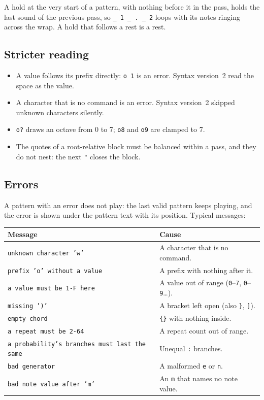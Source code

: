 \documentclass[11pt,a4paper]{article}
\newcommand{\pat}[1]{\texttt{#1}}
\begin{document}
A hold at the very start of a pattern, with nothing before it in the pass, holds
the last sound of the previous pass, so \pat{\_ 1 \_ . \_ 2} loops with its
notes ringing across the wrap. A hold that follows a rest is a rest.

\subsection{Stricter reading}

\begin{itemize}[leftmargin=1.5em]
  \item A value follows its prefix directly: \pat{o 1} is an error. Syntax
        version~2 read the space as the value.
  \item A character that is no command is an error. Syntax version~2 skipped
        unknown characters silently.
  \item \pat{o?} draws an octave from 0 to 7; \pat{o8} and \pat{o9} are clamped
        to 7.
  \item The quotes of a root-relative block must be balanced within a pass, and
        they do not nest: the next \pat{"} closes the block.
\end{itemize}

\subsection{Errors}

A pattern with an error does not play: the last valid pattern keeps playing, and
the error is shown under the pattern text with its position. Typical messages:

\begin{center}
\begin{tabular}{@{}ll@{}}
\toprule
\textbf{Message} & \textbf{Cause}\\
\midrule
\pat{unknown character 'w'}                  & A character that is no command.\\
\pat{prefix 'o' without a value}             & A prefix with nothing after it.\\
\pat{a value must be 1-F here}               & A value out of range (\pat{0}--\pat{7}, \pat{0}--\pat{9}\ldots).\\
\pat{missing ')'}                            & A bracket left open (also \pat{\}}, \pat{]}).\\
\pat{empty chord}                            & \pat{\{\}} with nothing inside.\\
\pat{a repeat must be 2-64}                  & A repeat count out of range.\\
\pat{a probability's branches must last the same} & Unequal \pat{:} branches.\\
\pat{bad generator}                          & A malformed \pat{e} or \pat{n}.\\
\pat{bad note value after 'm'}               & An \pat{m} that names no note value.\\
\bottomrule
\end{tabular}
\end{center}
\end{document}
